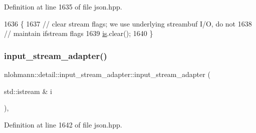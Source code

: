 Definition at line 1635 of file json.\+hpp.


\begin{DoxyCode}
1636     \{
1637         \textcolor{comment}{// clear stream flags; we use underlying streambuf I/O, do not}
1638         \textcolor{comment}{// maintain ifstream flags}
1639         \hyperlink{classnlohmann_1_1detail_1_1input__stream__adapter_ac3afada8eaf7d6cd2b475a3388d5e992}{is}.clear();
1640     \}
\end{DoxyCode}
\mbox{\label{classnlohmann_1_1detail_1_1input__stream__adapter_af487152e4606d013eb4ec6a90eaf82ea}} 
\subsubsection{\texorpdfstring{input\+\_\+stream\+\_\+adapter()}{input\_stream\_adapter()}\hspace{0.1cm}{\footnotesize\ttfamily [1/2]}}
{\footnotesize\ttfamily nlohmann\+::detail\+::input\+\_\+stream\+\_\+adapter\+::input\+\_\+stream\+\_\+adapter (\begin{DoxyParamCaption}\item[{std\+::istream \&}]{i }\end{DoxyParamCaption})\hspace{0.3cm}{\ttfamily [inline]}, {\ttfamily [explicit]}}



Definition at line 1642 of file json.\+hpp.


